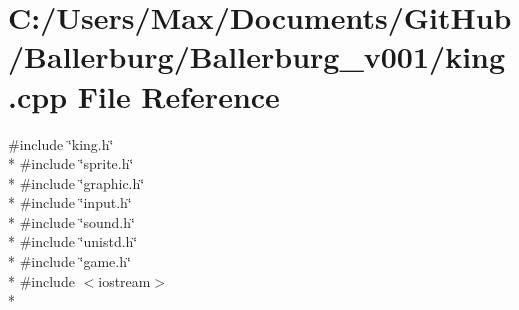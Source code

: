 \section{C\+:/\+Users/\+Max/\+Documents/\+Git\+Hub/\+Ballerburg/\+Ballerburg\+\_\+v001/king.cpp File Reference}
\label{king_8cpp}
{\ttfamily \#include \char`\"{}king.\+h\char`\"{}}\\*
{\ttfamily \#include \char`\"{}sprite.\+h\char`\"{}}\\*
{\ttfamily \#include \char`\"{}graphic.\+h\char`\"{}}\\*
{\ttfamily \#include \char`\"{}input.\+h\char`\"{}}\\*
{\ttfamily \#include \char`\"{}sound.\+h\char`\"{}}\\*
{\ttfamily \#include \char`\"{}unistd.\+h\char`\"{}}\\*
{\ttfamily \#include \char`\"{}game.\+h\char`\"{}}\\*
{\ttfamily \#include $<$iostream$>$}\\*
